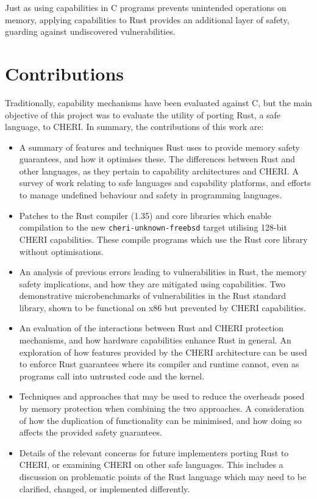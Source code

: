 \documentclass[dissertation.tex]{subfiles}
\begin{document}
Just as using capabilities in C programs prevents unintended operations
on memory, applying capabilities to Rust provides an additional layer of
safety, guarding against undiscovered vulnerabilities.


\section{Contributions}
\label{sec:intro-contrib}

Traditionally, capability mechanisms have been evaluated against C, but
the main objective of this project was to evaluate the utility of
porting Rust, a safe language, to CHERI.
In summary, the contributions of this work are:

\begin{itemize}
    \item A summary of features and techniques Rust uses to provide
    memory safety guarantees, and how it optimises these.
    The differences between Rust and other languages, as they pertain to
    capability architectures and CHERI.
    A survey of work relating to safe languages and capability
    platforms, and efforts to manage undefined behaviour and safety in
    programming languages.

    \item Patches to the Rust compiler (1.35) and core libraries which
    enable compilation to the new \texttt{cheri-unknown-freebsd} target
    utilising 128-bit CHERI capabilities.
    These compile programs which use the Rust core library without
    optimisations.

    \item An analysis of previous errors leading to vulnerabilities in
    Rust, the memory safety implications, and how they are mitigated
    using capabilities.
    Two demonstrative microbenchmarks of vulnerabilities in the Rust
    standard library, shown to be functional on x86 but prevented by
    CHERI capabilities.

    \item An evaluation of the interactions between Rust and CHERI
    protection mechanisms, and how hardware capabilities enhance Rust in
    general.
    An exploration of how features provided by the CHERI architecture
    can be used to enforce Rust guarantees where its compiler and
    runtime cannot, even as programs call into untrusted code and the
    kernel.

    \item Techniques and approaches that may be used to reduce the
    overheads posed by memory protection when combining the two
    approaches.
    A consideration of how the duplication of functionality can be
    minimised, and how doing so affects the provided safety guarantees.

    \item Details of the relevant concerns for future implementers
    porting Rust to CHERI, or examining CHERI on other safe languages.
    This includes a discussion on problematic points of the Rust
    language which may need to be clarified, changed, or implemented
    differently.
\end{itemize}
\end{document}
